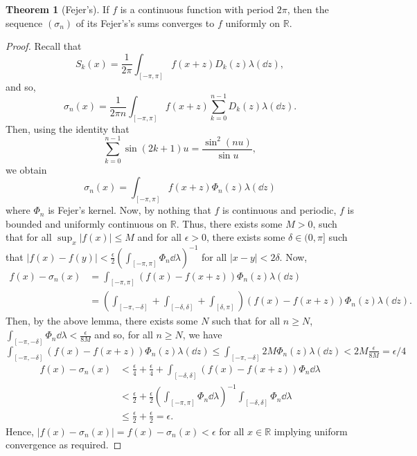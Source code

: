 \documentclass[]{article}
\theoremstyle{definition}
\newtheorem{theorem}{Theorem}
\theoremstyle{definition}
\begin{document}
\begin{theorem}[Fejer's]
  If \(f\) is a continuous function with period \(2\pi\), then the sequence \((\sigma_n)\) 
  of its Fejer's's sums converges to \(f\) uniformly on \(\mathbb{R}\).
\end{theorem}
\begin{proof}
  Recall that 
  \[S_k(x) = \frac{1}{2\pi} \int_{[-\pi, \pi]} f(x + z) D_k(z) \lambda(\dd z),\]
  and so, 
  \[\sigma_n(x) = \frac{1}{2\pi n} \int_{[-\pi, \pi]} f(x + z) \sum_{k = 0}^{n - 1} D_k(z) \lambda(\dd z).\]
  Then, using the identity that 
  \[\sum_{k = 0}^{n - 1} \sin(2k + 1)u = \frac{\sin^2(nu)}{\sin u},\]
  we obtain
  \[\sigma_n(x) = \int_{[-\pi, \pi]} f(x + z) \Phi_n(z) \lambda(\dd z)\]
  where \(\Phi_n\) is Fejer's kernel. Now, by nothing that \(f\) is continuous and 
  periodic, \(f\) is bounded and uniformly continuous on \(\mathbb{R}\). Thus, 
  there exists some \(M > 0\), such that for all \(\sup_x |f(x)| \le M\) and for 
  all \(\epsilon > 0\), there exists some \(\delta \in (0, \pi]\) such that 
  \(|f(x) - f(y)| < \frac{\epsilon}{2}\left(\int_{[-\pi, \pi]} \Phi_n \dd \lambda\right)^{-1}\) 
  for all \(|x - y| < 2\delta\). Now, 
  \[\begin{split}
    f(x) - \sigma_n(x) & = \int_{[-\pi, \pi]}(f(x) - f(x + z))\Phi_n(z) \lambda(\dd z)\\
    & = \left(\int_{[-\pi, -\delta]} + \int_{[-\delta, \delta]} + \int_{[\delta, \pi]}\right)
      (f(x) - f(x + z))\Phi_n(z) \lambda(\dd z).
  \end{split}\]
  Then, by the above lemma, there exists some \(N\) such that for all \(n \ge N\), 
  \(\int_{[-\pi, -\delta]}\Phi_n \dd \lambda < \frac{\epsilon}{8M}\) and so, for all 
  \(n \ge N\), we have \(\int_{[-\pi, -\delta]} (f(x) - f(x + z))\Phi_n(z) \lambda(\dd z) \le 
  \int_{[-\pi, -\delta]} 2M \Phi_n(z) \lambda(\dd z) < 2M \frac{\epsilon}{8M} = \epsilon / 4\)
  \[\begin{split}
    f(x) - \sigma_n(x) & < \frac{\epsilon}{4} + \frac{\epsilon}{4} +
    \int_{[-\delta, \delta]} (f(x) - f(x + z))\Phi_n \dd \lambda \\
    & < \frac{\epsilon}{2} + \frac{\epsilon}{2}\left(\int_{[-\pi, \pi]} \Phi_n \dd \lambda\right)^{-1}
      \int_{[-\delta, \delta]} \Phi_n \dd \lambda\\
    & \le \frac{\epsilon}{2} + \frac{\epsilon}{2} = \epsilon.
  \end{split}\] 
  Hence, \(|f(x) - \sigma_n(x)| = f(x) - \sigma_n(x) < \epsilon\) for all \(x \in \mathbb{R}\) 
  implying uniform convergence as required.
\end{proof}
\end{document}
